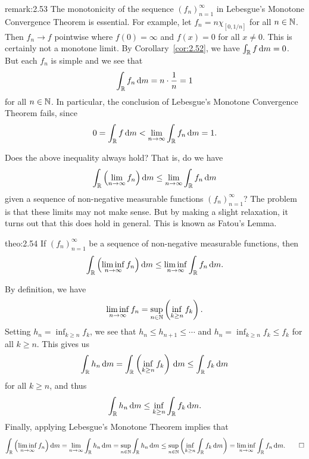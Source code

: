 \begin{remark}{remark:2.53}
    The monotonicity of the sequence $(f_n)_{n=1}^\infty$ in Lebesgue's 
    Monotone Convergence Theorem is essential. For example, let 
    $f_n = n\chi_{[0, 1/n]}$ for all $n \in \mathbb{N}$. Then $f_n \to f$ pointwise 
    where $f(0) = \infty$ and $f(x) = 0$ for all $x \neq 0$. 
    This is certainly not a monotone limit. By Corollary~\ref{cor:2.52}, we have 
    $\int_{\mathbb{R}} f\,\mathrm{d} m = 0$. But each $f_n$ is simple and we see that 
    \[ \int_{\mathbb{R}} f_n\,\mathrm{d} m = n \cdot \frac1n = 1 \] 
    for all $n \in \mathbb{N}$. In particular, the conclusion of Lebesgue's 
    Monotone Convergence Theorem fails, since 
    \[ 0 = \int_{\mathbb{R}} f\,\mathrm{d} m < \lim_{n\to\infty} \int_{\mathbb{R}} f_n\,\mathrm{d} m = 1. \] 
\end{remark}

Does the above inequality always hold? That is, do we have 
\[ \int_{\mathbb{R}} \left( \lim_{n\to\infty} f_n \right) \textrm{d}m 
\leq \lim_{n\to\infty} \int_{\mathbb{R}} f_n\,\mathrm{d} m \] 
given a sequence of non-negative measurable functions $(f_n)_{n=1}^\infty$? 
The problem is that these limits may not make sense. But by making a slight 
relaxation, it turns out that this does hold in general. This is known 
as Fatou's Lemma. 

\begin{theo}{theo:2.54}
    If $(f_n)_{n=1}^\infty$ be a sequence of non-negative measurable functions, then
    \[ \int_{\mathbb{R}} \left( \liminf_{n\to\infty} f_n \right) \textrm{d}m 
    \leq \liminf_{n\to\infty} \int_{\mathbb{R}} f_n\,\mathrm{d} m. \] 
\end{theo}
\begin{pf}
    By definition, we have 
    \[ \liminf_{n\to\infty} f_n = \sup_{n\in\mathbb{N}} \left( \inf_{k\geq n} f_k \right). \] 
    Setting $h_n = \inf_{k\geq n} f_k$, we see that $h_n \leq h_{n+1} \leq 
    \cdots$ and $h_n = \inf_{k\geq n} f_k \leq f_k$ for all $k \geq n$. This 
    gives us 
    \[ \int_{\mathbb{R}} h_n\,\mathrm{d} m = \int_{\mathbb{R}} \left( \inf_{k\geq n} f_k \right)\,\mathrm{d} m 
    \leq \int_{\mathbb{R}} f_k\,\mathrm{d} m \] 
    for all $k \geq n$, and thus 
    \[ \int_{\mathbb{R}} h_n\,\mathrm{d} m \leq \inf_{k\geq n} \int_{\mathbb{R}} f_k\,\mathrm{d} m. \] 
    Finally, applying Lebesgue's Monotone Theorem implies that 
    \[ \int_{\mathbb{R}} \left( \liminf_{n\to\infty} f_n \right) \textrm{d}m 
    = \lim_{n\to\infty} \int_{\mathbb{R}} h_n\,\mathrm{d} m 
    = \sup_{n\in\mathbb{N}} \int_{\mathbb{R}} h_n\,\mathrm{d} m 
    \leq \sup_{n\in\mathbb{N}} \left( \inf_{k\geq n} \int_{\mathbb{R}} f_k\,\mathrm{d} m \right) 
    = \liminf_{n\to\infty} \int_{\mathbb{R}} f_n\,\mathrm{d} m. \qedhere \] 
\end{pf}

